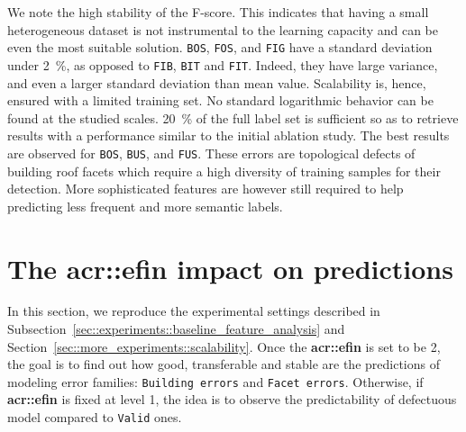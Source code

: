         We note the high stability of the F-score.
        This indicates that having a small heterogeneous dataset is not instrumental to the learning capacity and can be even the most suitable solution.
        \texttt{BOS}, \texttt{FOS}, and \texttt{FIG} have a standard deviation under \SI{2}{\percent}, as opposed to \texttt{FIB}, \texttt{BIT} and \texttt{FIT}.
        Indeed, they have large variance, and even a larger standard deviation than mean value.
        Scalability is, hence, ensured with a limited training set.
        No standard logarithmic behavior can be found at the studied scales.
        \SI{20}{\percent} of the full label set is sufficient so as to retrieve results with a performance similar to the initial ablation study.
        The best results are observed for \texttt{BOS}, \texttt{BUS}, and \texttt{FUS}.
        These errors are topological defects of building roof facets which require a high diversity of training samples for their detection.
        More sophisticated features are however still required to help predicting less frequent and more semantic labels.
    
\section{The \texorpdfstring{\acrlong*{acr::efin}}{eFin} impact on predictions}
    \label{sec::more_experiments::finesse}
    In this section, we reproduce the experimental settings described in Subsection~\ref{sec::experiments::baseline_feature_analysis} and Section~\ref{sec::more_experiments::scalability}.
    Once the \textbf{\gls{acr::efin}} is set to be 2, the goal is to find out how good, transferable and stable are the predictions of modeling error families: \texttt{Building errors} and \texttt{Facet errors}.
    Otherwise, if \textbf{\gls{acr::efin}} is fixed at level 1, the idea is to observe the predictability of defectuous model compared to \texttt{Valid} ones.
    
